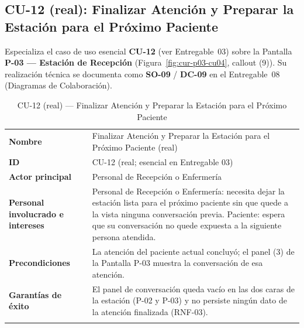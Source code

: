 \subsection{CU-12 (real): Finalizar Atención y Preparar la Estación para el
Próximo Paciente}

Especializa el caso de uso esencial \textbf{CU-12} (ver Entregable~03) sobre
la Pantalla \textbf{P-03 --- Estación de Recepción}
(Figura~\ref{fig:cur-p03-cu04}, callout (9)). Su realización técnica se
documenta como \textbf{SO-09} / \textbf{DC-09} en el Entregable~08
(Diagramas de Colaboración).

\begin{longtable}{@{}p{4.1cm} >{\raggedright\arraybackslash}p{11.2cm}@{}}
\toprule
\textbf{Nombre} & Finalizar Atención y Preparar la Estación para el Próximo
Paciente (real) \\
\textbf{ID} & CU-12 (real; esencial en Entregable 03) \\
\textbf{Actor principal} & Personal de Recepción o Enfermería \\
\textbf{Personal involucrado e intereses} &
Personal de Recepción o Enfermería: necesita dejar la estación lista para
el próximo paciente sin que quede a la vista ninguna conversación previa.
\newline
Paciente: espera que su conversación no quede expuesta a la siguiente
persona atendida. \\
\textbf{Precondiciones} &
La atención del paciente actual concluyó; el panel (3) de la Pantalla
P-03 muestra la conversación de esa atención. \\
\textbf{Garantías de éxito} &
El panel de conversación queda vacío en las dos caras de la estación
(P-02 y P-03) y no persiste ningún dato de la atención finalizada (RNF-03). \\
\bottomrule
\caption{CU-12 (real) — Finalizar Atención y Preparar la Estación para el
Próximo Paciente}
\end{longtable}

